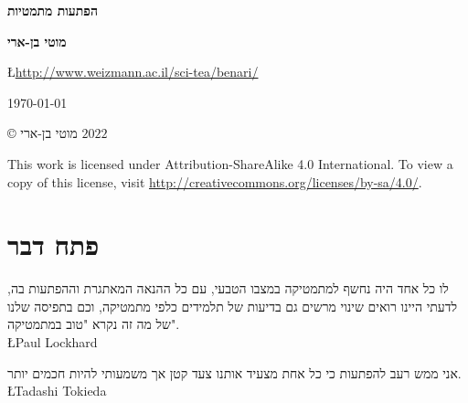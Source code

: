 
\pagestyle{empty}

\begin{center}
\textbf{\Huge הפתעות מתמטיות}
 
\bigskip
\bigskip
\bigskip
\bigskip

\textbf{\Large מוטי בן-ארי}

\bigskip
\bigskip


\L{\url{http://www.weizmann.ac.il/sci-tea/benari/}}

\bigskip
\bigskip

\today{}
\end{center}


\vfill

\begin{center}
\copyright{} מוטי בן-ארי
$2022$
 \end{center}

\begin{english}
\begin{small}
This work is licensed under Attribution-ShareAlike 4.0 International. To view a copy of this license, visit \url{http://creativecommons.org/licenses/by-sa/4.0/}.

\end{small}
\end{english}



\thispagestyle{empty}
\pagestyle{plain}

\chapter*{פתח דבר}
\thispagestyle{empty}

\begin{flushleft}
\parbox{7cm}{
\begin{small}
\begin{flushleft}
לו כל אחד היה נחשף למתמטיקה במצבו הטבעי, עם כל ההנאה המאתגרת וההפתעות בה, לדעתי היינו רואים שינוי מרשים גם בדיעות של תלמידים כלפי מתמטיקה, וכם בתפיסה שלנו של מה זה נקרא "טוב במתמטיקה".\\
\L{Paul Lockhard}

\smallskip

אני ממש רעב להפתעות כי כל אחת מצעיד אותנו צעד קטן אך משמעותי להיות חכמים יותר.\\
\L{Tadashi Tokieda}
\end{flushleft}
\end{small}
}
\end{flushleft}

